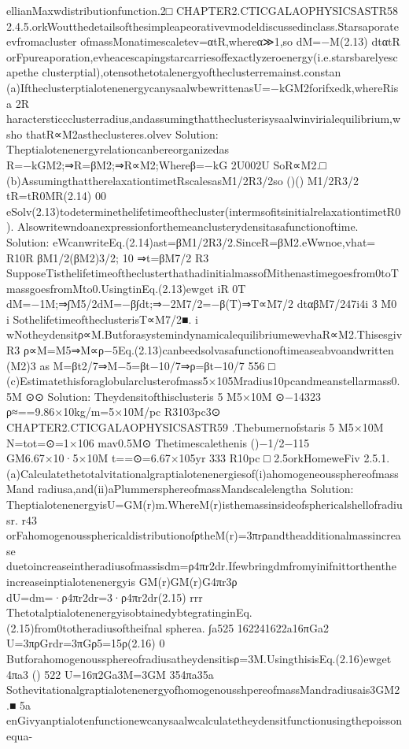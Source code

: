 ellianMaxwdistributionfunction.2□
CHAPTER2.CTICGALAOPHYSICSASTR58
2.4.5.orkWoutthedetailsofthesimpleapeorativevmodeldiscussedinclass.Starsaporateevfromacluster
ofmassMonatimescaletev=αtR,whereα≫1,so
dM=−M(2.13)
dtαtR
orFpureaporation,evheacescapingstarcarriesoffexactlyzeroenergy(i.e.starsbarelyescapethe
clusterptial),otensothetotalenergyoftheclusterremainst.constan
(a)IftheclusterptialotenenergycanysaalwbewrittenasU=−kGM2forifxedk,whereRisa
2R
haractersticcclusterradius,andassumingthattheclusterisysaalwinvirialequilibrium,wsho
thatR∝M2astheclusteres.olvev
Solution:
Theptialotenenergyrelationcanbereorganizedas
R=−kGM2;⇒R=βM2;⇒R∝M2;Whereβ=−kG
2U002U
SoR∝M2.□
(b)AssumingthattherelaxationtimetRscalesasM1/2R3/2so
()()
M1/2R3/2
tR=tR0MR(2.14)
00
eSolv(2.13)todeterminethelifetimeofthecluster(intermsofitsinitialrelaxationtimetR0).
Alsowritewndoanexpressionforthemeanclusterydensitasafunctionoftime.
Solution:
eWcanwriteEq.(2.14)ast=βM1/2R3/2.SinceR=βM2.eWwnoe,vhat=
R10R
βM1/2(βM2)3/2;
10
⇒t=βM7/2
R3
SupposeTisthelifetimeoftheclusterthathadinitialmassofMithenastimegoesfrom0toT
massgoesfromMto0.UsingtinEq.(2.13)ewget
iR
0T
dM=−1M;⇒∫M5/2dM=−β∫dt;⇒−2M7/2=−β(T)⇒T∝M7/2
dtαβM7/247i4i
3
M0
i
SothelifetimeoftheclusterisT∝M7/2■.
i
wNotheydensitρ∝M.ButforasystemindynamicalequilibriumewevhaR∝M2.Thisesgiv
R3
ρ∝M=M5⇒M∝ρ−5Eq.(2.13)canbeedsolvasafunctionoftimeaseabvoandwritten
(M2)3
as
M=βt2/7⇒M−5=βt−10/7⇒ρ=βt−10/7
556
□
(c)Estimatethisforaglobularclusterofmass5×105Mradius10pcandmeanstellarmass0.5M
⊙⊙
Solution:
Theydensitofthisclusteris
5
M5×10M
⊙−14323
ρ≈==9.86×10kg/m=5×10M/pc
R3103pc3⊙
CHAPTER2.CTICGALAOPHYSICSASTR59
.Thebumernofstaris
5
M5×10M
N=tot=⊙=1×106
mav0.5M⊙
Thetimescalethenis
()−1/2−115
GM6.67×10·5×10M
t==⊙=6.67×105yr
333
R10pc
□
2.5orkHomeweFiv
2.5.1.(a)Calculatethetotalvitationalgraptialotenenergiesof(i)ahomogeneoussphereofmassMand
radiusa,and(ii)aPlummersphereofmassMandscalelengtha
Solution:
TheptialotenenergyisU=GM(r)m.WhereM(r)isthemassinsideofsphericalshellofradiusr.
r43
orFahomogenoussphericaldistributionofρtheM(r)=3πrρandtheadditionalmassincrease
duetoincreaseintheradiusofmassisdm=ρ4πr2dr.Ifewbringdmfromyinifnittorthenthe
increaseinptialotenenergyis
GM(r)GM(r)G4πr3ρ
dU=dm=·ρ4πr2dr=3·ρ4πr2dr(2.15)
rrr
ThetotalptialotenenergyisobtainedybtegratinginEq.(2.15)from0totheradiusoftheifnal
spherea.
∫a525
162241622a16πGa2
U=3πρGrdr=3πGρ5=15ρ(2.16)
0
Butforahomogenoussphereofradiusatheydensitisρ=3M.UsingthisisEq.(2.16)ewget
4πa3
()
522
U=16π2Ga3M=3GM
354πa35a
SothevitationalgraptialotenenergyofhomogenousshpereofmassMandradiusais3GM2.■
5a
enGivyanptialotenfunctionewcanysaalwcalculatetheydensitfunctionusingthepoissonequa-
